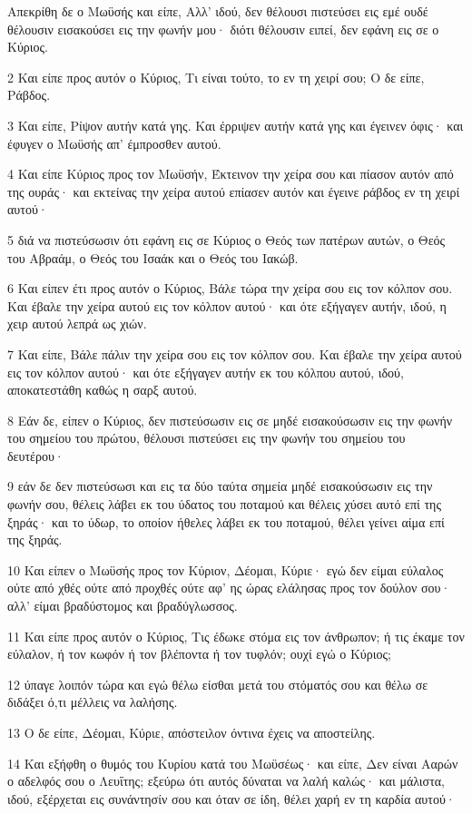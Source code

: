 \par Απεκρίθη δε ο Μωϋσής και είπε, Αλλ' ιδού, δεν θέλουσι πιστεύσει εις εμέ ουδέ θέλουσιν εισακούσει εις την φωνήν μου· διότι θέλουσιν ειπεί, δεν εφάνη εις σε ο Κύριος.
\par 2 Και είπε προς αυτόν ο Κύριος, Τι είναι τούτο, το εν τη χειρί σου; Ο δε είπε, Ράβδος.
\par 3 Και είπε, Ρίψον αυτήν κατά γης. Και έρριψεν αυτήν κατά γης και έγεινεν όφις· και έφυγεν ο Μωϋσής απ' έμπροσθεν αυτού.
\par 4 Και είπε Κύριος προς τον Μωϋσήν, Έκτεινον την χείρα σου και πίασον αυτόν από της ουράς· και εκτείνας την χείρα αυτού επίασεν αυτόν και έγεινε ράβδος εν τη χειρί αυτού·
\par 5 διά να πιστεύσωσιν ότι εφάνη εις σε Κύριος ο Θεός των πατέρων αυτών, ο Θεός του Αβραάμ, ο Θεός του Ισαάκ και ο Θεός του Ιακώβ.
\par 6 Και είπεν έτι προς αυτόν ο Κύριος, Βάλε τώρα την χείρα σου εις τον κόλπον σου. Και έβαλε την χείρα αυτού εις τον κόλπον αυτού· και ότε εξήγαγεν αυτήν, ιδού, η χειρ αυτού λεπρά ως χιών.
\par 7 Και είπε, Βάλε πάλιν την χείρα σου εις τον κόλπον σου. Και έβαλε την χείρα αυτού εις τον κόλπον αυτού· και ότε εξήγαγεν αυτήν εκ του κόλπου αυτού, ιδού, αποκατεστάθη καθώς η σαρξ αυτού.
\par 8 Εάν δε, είπεν ο Κύριος, δεν πιστεύσωσιν εις σε μηδέ εισακούσωσιν εις την φωνήν του σημείου του πρώτου, θέλουσι πιστεύσει εις την φωνήν του σημείου του δευτέρου·
\par 9 εάν δε δεν πιστεύσωσι και εις τα δύο ταύτα σημεία μηδέ εισακούσωσιν εις την φωνήν σου, θέλεις λάβει εκ του ύδατος του ποταμού και θέλεις χύσει αυτό επί της ξηράς· και το ύδωρ, το οποίον ήθελες λάβει εκ του ποταμού, θέλει γείνει αίμα επί της ξηράς.
\par 10 Και είπεν ο Μωϋσής προς τον Κύριον, Δέομαι, Κύριε· εγώ δεν είμαι εύλαλος ούτε από χθές ούτε από προχθές ούτε αφ' ης ώρας ελάλησας προς τον δούλον σου· αλλ' είμαι βραδύστομος και βραδύγλωσσος.
\par 11 Και είπε προς αυτόν ο Κύριος, Τις έδωκε στόμα εις τον άνθρωπον; ή τις έκαμε τον εύλαλον, ή τον κωφόν ή τον βλέποντα ή τον τυφλόν; ουχί εγώ ο Κύριος;
\par 12 ύπαγε λοιπόν τώρα και εγώ θέλω είσθαι μετά του στόματός σου και θέλω σε διδάξει ό,τι μέλλεις να λαλήσης.
\par 13 Ο δε είπε, Δέομαι, Κύριε, απόστειλον όντινα έχεις να αποστείλης.
\par 14 Και εξήφθη ο θυμός του Κυρίου κατά του Μωϋσέως· και είπε, Δεν είναι Ααρών ο αδελφός σου ο Λευΐτης; εξεύρω ότι αυτός δύναται να λαλή καλώς· και μάλιστα, ιδού, εξέρχεται εις συνάντησίν σου και όταν σε ίδη, θέλει χαρή εν τη καρδία αυτού·
